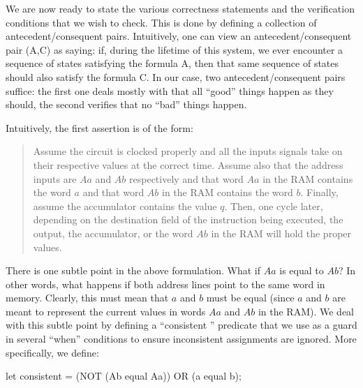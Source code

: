 We are now ready to state the various correctness statements and
the verification conditions that we wish to check.
This is done by defining a collection of antecedent/consequent pairs.
Intuitively, one can view an antecedent/consequent pair (A,C) as saying:
if, during the lifetime of this system, we ever encounter a sequence of
states satisfying the formula A, then that same sequence of states
should also satisfy the formula C.
In our case, two antecedent/consequent pairs suffice: the first
one deals mostly with that all ``good'' things happen as they should,
the second verifies that no ``bad'' things happen.

Intuitively, the first assertion is of the form:
\begin{quote}
Assume the circuit is clocked properly and all the inputs signals take
on their respective values at the correct time. Assume also
that the address inputs are $Aa$ and $Ab$ respectively and that
word $Aa$ in the RAM contains the word $a$ and that word $Ab$ in the RAM
contains the word $b$.
Finally, assume the accumulator contains the value $q$.
Then, one cycle later, depending on the destination field of the
instruction being executed, the output, the accumulator, or
the word $Ab$ in the RAM will hold the proper values.
\end{quote}
There is one subtle point in the above formulation.
What if $Aa$ is equal to $Ab$?
In other words, what happens if both address lines point to the
same word in memory.
Clearly, this must mean that $a$ and $b$ must be equal (since $a$ and $b$
are meant to represent the current values in words $Aa$ and $Ab$ in the RAM).
We deal with this subtle point by defining a ``consistent%
%
{}'' predicate
that we use as a guard in several ``when'' conditions to ensure
inconsistent assignments are ignored.
More specifically, we define:
\begin{hol}
let consistent = (NOT (Ab equal Aa)) OR (a equal b);
\end{hol}

